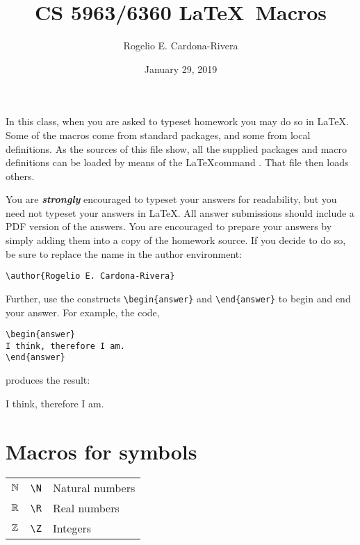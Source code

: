 \documentclass{article}
\title{CS 5963/6360 \LaTeX~Macros}
\author{Rogelio E. Cardona-Rivera}
\date{January 29, 2019}
\begin{document}
\maketitle

In this class, when you are asked to typeset homework you may do
so in \LaTeX.  Some of the macros come from standard packages, 
and some from local definitions.  As the sources of this file 
show, all the supplied packages and macro definitions can be 
loaded by means of the \LaTeX command 
\verb++. That file then loads others.

You are \textbf{\textit{strongly}} encouraged to typeset your answers for 
readability, but you need not typeset your answers in \LaTeX. 
All answer submissions should include a PDF version of the 
answers. You are encouraged to prepare your answers by simply 
adding them into a copy of the homework source.  If you decide
to do so, be sure to replace the name in the author environment:

\begin{verbatim}
\author{Rogelio E. Cardona-Rivera}
\end{verbatim}

\noindent Further, use the constructs \verb+\begin{answer}+ and 
\verb+\end{answer}+ to begin and end your answer.  For example, 
the code,

\begin{verbatim}
\begin{answer}
I think, therefore I am.
\end{answer}
\end{verbatim}

\noindent produces the result:\\[5pt]

\begin{answer}
I think, therefore I am.
\end{answer}


\section{Macros for symbols}

\begin{center}
  \begin{tabular}[h]{lll}
    $\mathbb{N}$ & \verb+\N+ & Natural numbers \\
    $\mathbb{R}$ & \verb+\R+ & Real numbers \\
    $\mathbb{Z}$ & \verb+\Z+ & Integers \\
  \end{tabular}
\end{center}
\end{document}
